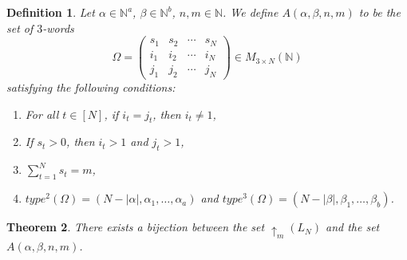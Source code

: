 \documentclass[11pt]{article}
\newtheorem{thm}{Theorem}%
\newtheorem{defi}[thm]{Definition}
\begin{document}
\begin{defi}
Let \( \alpha \in \mathbb{N}^a \), \( \beta \in \mathbb{N}^b \), \( n, m \in \mathbb{N} \). We define \( A(\alpha, \beta, n, m) \) to be the set of \( 3 \)-words
\[
\Omega =
\begin{pmatrix}
s_1 & s_2 & \cdots & s_N \\
i_1 & i_2 & \cdots & i_N \\
j_1 & j_2 & \cdots & j_N
\end{pmatrix}
\in M_{3 \times N}(\mathbb{N})
\]
satisfying the following conditions:
\begin{enumerate}
    \item For all \( t \in [N] \), if \( i_t = j_t \), then \( i_t \neq 1 \),
    \item If \( s_t > 0 \), then \( i_t > 1 \) and \( j_t > 1 \),
    \item \( \sum_{t = 1}^{N} s_t = m \),
    \item \( type^2(\Omega)  = (N - |\alpha|, \alpha_1, \dots, \alpha_a) \) and
          \( type^3(\Omega)  = (N - |\beta|, \beta_1, \dots, \beta_b) \).
\end{enumerate}
\end{defi}

\begin{thm}\label{thm:3words-bijection}
There exists a bijection between the set \( \uparrow_m(L_N) \) and the set \( A(\alpha, \beta, n, m) \).
\end{thm}
\end{document}
